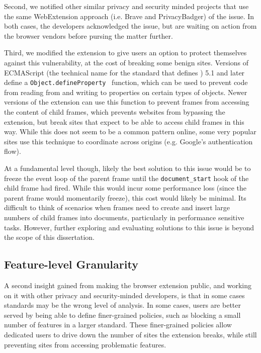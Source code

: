 Second, we notified other similar privacy and security minded
projects that use the same WebExtension approach (i.e. Brave and PrivacyBadger)
of the issue.  In both cases, the developers acknowledged the issue, but are
waiting on action from the browser vendors before pursing the matter further.

Third, we modified the extension to give users an option to protect themselves
against this vulnerability, at the cost of breaking some benign sites.  Versions
of ECMAScript (the technical name for the standard that defines \JS) 5.1
and later define a \texttt{Object.defineProperty}~\cite{ecmascript51} function,
which can be used to prevent code from reading from and writing to properties
on certain types of objects.  Newer versions of the extension can use this
function  to prevent frames from accessing the content of child frames,
which prevents websites from bypassing the extension, but break sites
that expect to be able to access child frames in this way.  While this does
not seem to be a common pattern online, some very popular sites use this
technique to coordinate across origins (e.g. Google's authentication flow).

At a fundamental level though, likely the best solution to this issue would be
to freeze the event loop of the parent frame until the \texttt{document\_start}
hook of the child frame had fired.  While this would incur some performance
loss (since the parent frame would momentarily freeze), this cost would
likely be minimal.  Its difficult to think of scenarios when frames need
to create and insert large numbers of child frames into documents, particularly
in performance sensitive tasks.  However, further exploring and evaluating
solutions to this issue is beyond the scope of this dissertation.


\subsection{Feature-level Granularity}
A second insight gained from making the browser extension public, and working
on it with other privacy and security-minded developers, is that in some cases
\WAPI standards may be the wrong level of analysis.  In some cases, users
are better served by being able to define finer-grained policies, such as blocking
a small number of features in a larger standard.  These finer-grained policies
allow dedicated users to drive down the number of sites the extension breaks,
while still preventing sites from accessing problematic \WAPI features.

